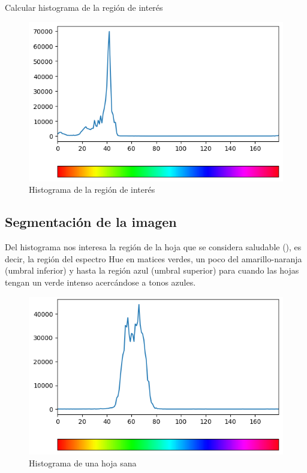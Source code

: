 \begin{listing}[H]
\inputminted{python}{code_listings/histogram.py}
\caption{Calcular histograma de la región de interés}
\label{code:histogram}
\end{listing}

\begin{figure}[H]
\centering
\includegraphics[width=\textwidth]{images/histogram.png}
\caption{Histograma de la región de interés}
\label{img:histogram}
\end{figure}

\subsection{Segmentación de la imagen}
\label{sec:segmentation}
Del histograma nos interesa la región de la hoja que se considera saludable (), es decir, la región del espectro Hue en matices verdes, un poco del amarillo-naranja (umbral inferior) y hasta la región azul (umbral superior) para cuando las hojas tengan un verde intenso acercándose a tonos azules.

\begin{figure}[H]
\centering
\includegraphics[width=\textwidth]{images/histogram_healthy.png}
\caption{Histograma de una hoja sana}
\label{img:histogram_healthy}
\end{figure}

